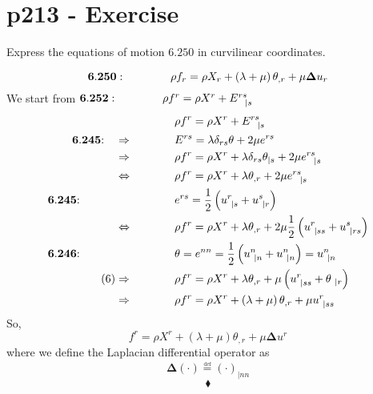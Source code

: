 \section{p213 - Exercise}
\begin{tcolorbox}
Express the equations of motion   $\mathbf{6.250}$ in curvilinear coordinates.
\end{tcolorbox}
$$\mathbf{6.250}: \quad\quad\quad\quad \rho f_r= \rho X_r+\left(\lambda+ \mu\right)\theta_{,r}+\mu\mathbf{\Delta}u_r$$
We start from $\mathbf{6.252}: \quad\quad\quad\quad \rho f^r= \rho X^r+E^{rs}_{\ \ |s}$
\begin{align}
& \rho f^r= \rho X^r+E^{rs}_{\ \ |s}\\
\mathbf{6.245}\text{:}\quad\Rightarrow\spatie & E^{rs} = \lambda \delta_{rs} \theta + 2 \mu e^{rs}\\
\Rightarrow\spatie & \rho f^r= \rho X^r+\lambda \delta_{rs} \theta _{ |s} + 2 \mu e^{rs}_{\ \ |s}\\
\Leftrightarrow\spatie & \rho f^r= \rho X^r+\lambda  \theta _{,r} + 2 \mu e^{rs}_{\ \ |s}\\
\mathbf{6.245}\text{: }\spatie \spatie & e^{rs} = \half\left(u^r_{\ |s}+u^s_{\ |r}\right)\\
\Leftrightarrow\spatie & \rho f^r= \rho X^r+\lambda  \theta _{,r} + 2 \mu \half\left(u^r_{\ |ss}+u^s_{\ |rs}\right)\\
\mathbf{6.246}\text{: }\spatie \spatie &\theta = e^{nn} = \half\left(u^n_{\ |n}+u^n_{\ |n}\right) = u^n_{\ |n}\\
\text{(6)}\Rightarrow\spatie & \rho f^r= \rho X^r+\lambda  \theta _{,r} + \mu \left(u^r_{\ |ss}+\theta_{\ |r}\right)\\
\Rightarrow\spatie & \rho f^r= \rho X^r+\left(\lambda +\mu\right) \theta _{,r} + \mu u^r_{\ |ss}
\end{align}
So, $$f^r= \rho X^r+\left(\lambda +\mu\right) \theta _{,r} + \mu \mathbf {\Delta}u^r$$
where we define the Laplacian differential operator as $$\mathbf{\Delta}\left({\cdot}\right) \overset{\underset{\mathrm{def}}{}}{=} \left({\cdot}\right)_{|nn}$$
 $$\blacklozenge$$
\newpage

